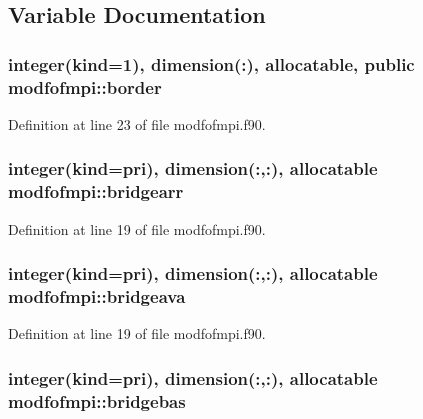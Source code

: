 \subsection{Variable Documentation}
\subsubsection[{\texorpdfstring{border}{border}}]{\setlength{\rightskip}{0pt plus 5cm}integer(kind=1), dimension(\+:), allocatable, public modfofmpi\+::border}\hypertarget{namespacemodfofmpi_adb1afd2b26b96173f56ab37495e99e99}{}\label{namespacemodfofmpi_adb1afd2b26b96173f56ab37495e99e99}


Definition at line 23 of file modfofmpi.\+f90.

\subsubsection[{\texorpdfstring{bridgearr}{bridgearr}}]{\setlength{\rightskip}{0pt plus 5cm}integer(kind=pri), dimension(\+:,\+:), allocatable modfofmpi\+::bridgearr}\hypertarget{namespacemodfofmpi_a3dffef2edd7b2899179cb3ffffd62430}{}\label{namespacemodfofmpi_a3dffef2edd7b2899179cb3ffffd62430}


Definition at line 19 of file modfofmpi.\+f90.

\subsubsection[{\texorpdfstring{bridgeava}{bridgeava}}]{\setlength{\rightskip}{0pt plus 5cm}integer(kind=pri), dimension(\+:,\+:), allocatable modfofmpi\+::bridgeava}\hypertarget{namespacemodfofmpi_a9891331c8f9f2ef3b5532b96129683ac}{}\label{namespacemodfofmpi_a9891331c8f9f2ef3b5532b96129683ac}


Definition at line 19 of file modfofmpi.\+f90.

\subsubsection[{\texorpdfstring{bridgebas}{bridgebas}}]{\setlength{\rightskip}{0pt plus 5cm}integer(kind=pri), dimension(\+:,\+:), allocatable modfofmpi\+::bridgebas}\hypertarget{namespacemodfofmpi_a2bdd3864a996f2afb8e49bbcdbd120e5}{}\label{namespacemodfofmpi_a2bdd3864a996f2afb8e49bbcdbd120e5}


